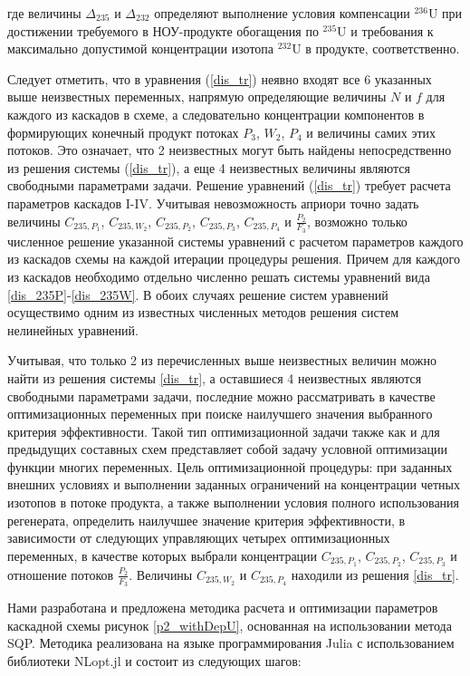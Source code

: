 где величины  $\Delta_{235}$ и $\Delta_{232}$ определяют выполнение условия компенсации $^{236}$U при достижении требуемого в НОУ-продукте обогащения по $^{235}$U и требования к максимально допустимой концентрации изотопа $^{232}$U в продукте, соответственно.

Следует отметить, что в уравнения (\ref{dis_tr}) неявно входят все 6 указанных выше неизвестных переменных, напрямую определяющие величины $N$ и $f$ для каждого из каскадов в схеме, а следовательно концентрации компонентов в формирующих конечный продукт потоках $P_3$, $W_2$, $P_4$ и величины самих этих потоков. Это означает, что 2 неизвестных могут быть найдены непосредственно из решения системы (\ref{dis_tr}), а еще 4 неизвестных величины являются свободными параметрами задачи. Решение уравнений (\ref{dis_tr}) требует расчета параметров каскадов I-IV. Учитывая невозможность априори точно задать величины $C_{235,{P_1}}$, $C_{235,{W_2}}$, $C_{235,{P_2}}$, $C_{235,{P_3}}$, $C_{235,{P_4}}$ и $\frac{P_{2}}{F_3}$, возможно только численное решение указанной системы уравнений с расчетом параметров каждого из каскадов схемы на каждой итерации процедуры решения. Причем для каждого из каскадов необходимо отдельно численно решать системы уравнений вида \ref{dis_235P}-\ref{dis_235W}. В обоих случаях решение систем уравнений осуществимо одним из известных численных методов решения систем нелинейных уравнений. 

Учитывая, что только 2 из перечисленных выше неизвестных величин можно найти из решения системы \ref{dis_tr}, а оставшиеся 4 неизвестных являются свободными параметрами задачи, последние можно рассматривать в качестве оптимизационных переменных при поиске наилучшего значения выбранного критерия эффективности. Такой тип оптимизационной задачи также как и для предыдущих составных схем представляет собой задачу условной оптимизации функции многих переменных. Цель оптимизационной процедуры: при заданных внешних условиях и выполнении заданных ограничений на концентрации четных изотопов в потоке продукта, а также выполнении условия полного использования регенерата, определить наилучшее значение критерия эффективности, в зависимости от следующих управляющих четырех оптимизационных переменных, в качестве которых выбрали концентрации $C_{235,{P_1}}$, $C_{235,{P_2}}$, $C_{235,{P_3}}$ и отношение потоков $\frac{P_{2}}{F_3}$. Величины $C_{235,{W_2}}$ и $C_{235,{P_4}}$ находили из решения \ref{dis_tr}. 

Нами разработана и предложена методика расчета и оптимизации параметров каскадной схемы рисунок \ref{p2_withDepU}, основанная на использовании метода SQP.
Методика реализована на языке программирования Julia с использованием библиотеки NLopt.jl \cite{NLopt} и состоит из следующих шагов:

